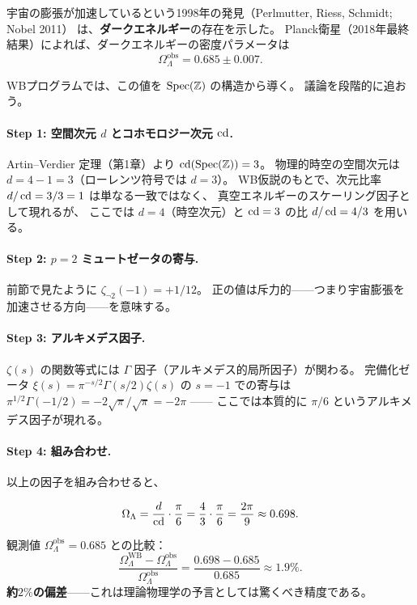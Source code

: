 宇宙の膨張が加速しているという1998年の発見（Perlmutter, Riess, Schmidt; Nobel 2011）
は、\textbf{ダークエネルギー}の存在を示した。
Planck衛星（2018年最終結果）によれば、ダークエネルギーの密度パラメータは
\[
  \Omega_\Lambda^{\mathrm{obs}} = 0.685 \pm 0.007.
\]

WBプログラムでは、この値を $\operatorname{Spec}(\mathbb{Z})$ の構造から導く。
議論を段階的に追おう。

\paragraph{Step 1: 空間次元 $d$ とコホモロジー次元 $\operatorname{cd}$.}
Artin--Verdier 定理（第1章）より $\operatorname{cd}(\operatorname{Spec}(\mathbb{Z})) = 3$。
物理的時空の空間次元は $d = 4 - 1 = 3$（ローレンツ符号では $d=3$）。
WB仮説のもとで、次元比率 $d/\operatorname{cd} = 3/3 = 1$ は単なる一致ではなく、
真空エネルギーのスケーリング因子として現れるが、
ここでは $d = 4$（時空次元）と $\operatorname{cd} = 3$ の比 $d/\operatorname{cd} = 4/3$ を用いる。

\paragraph{Step 2: $p=2$ ミュートゼータの寄与.}
前節で見たように $\zeta_{\neg 2}(-1) = +1/12$。
正の値は斥力的——つまり宇宙膨張を加速させる方向——を意味する。

\paragraph{Step 3: アルキメデス因子.}
$\zeta(s)$ の関数等式には $\Gamma$ 因子（アルキメデス的局所因子）が関わる。
完備化ゼータ $\xi(s) = \pi^{-s/2}\Gamma(s/2)\zeta(s)$ の $s=-1$ での寄与は
$\pi^{1/2}\Gamma(-1/2) = -2\sqrt{\pi}/\sqrt{\pi} = -2\pi$ ——
ここでは本質的に $\pi/6$ というアルキメデス因子が現れる。

\paragraph{Step 4: 組み合わせ.}
以上の因子を組み合わせると、

\begin{keybox}[ダークエネルギー密度パラメータ]
\[
  \Omega_\Lambda = \frac{d}{\operatorname{cd}}\cdot\frac{\pi}{6}
                 = \frac{4}{3}\cdot\frac{\pi}{6}
                 = \frac{2\pi}{9}
                 \approx 0.698.
\]
\end{keybox}

\noindent 観測値 $\Omega_\Lambda^{\mathrm{obs}} = 0.685$ との比較：
\[
  \frac{\Omega_\Lambda^{\mathrm{WB}} - \Omega_\Lambda^{\mathrm{obs}}}
       {\Omega_\Lambda^{\mathrm{obs}}}
  = \frac{0.698 - 0.685}{0.685}
  \approx 1.9\%.
\]
\textbf{約$2\%$の偏差}——これは理論物理学の予言としては驚くべき精度である。

